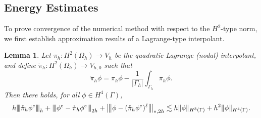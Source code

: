 \documentclass[10pt, a4paper]{amsart}
\newtheorem{lemma}[theorem]{Lemma}
\theoremstyle{definition}
\theoremstyle{remark}
\theoremstyle{example}
\numberwithin{equation}{section}
\newcommand{\tbar}[1]{{\left\vert\kern-0.25ex\left\vert\kern-0.25ex\left\vert #1 
    \right\vert\kern-0.25ex\right\vert\kern-0.25ex\right\vert}}
\begin{document}
\subsection{Energy Estimates}
To prove convergence of the numerical method
with respect to the $H^2$-type norm,
we first establish approximation results
of a Lagrange-type interpolant.
\begin{lemma} \label{lem:InterpFun}
Let $\pi_h:H^2(\Omega_h)\to V_{h}$ be the
quadratic Lagrange (nodal) interpolant, and define $\mathring{\pi}_h:H^2(\Omega_h)\to V_{h,0}$
such that
\[
\mathring{\pi}_h \phi = \pi_h \phi - \frac1{|\Gamma_h|} \int_{\Gamma_h} \pi_h \phi.
\]
Then there holds, for all $\phi\in H^4(\Gamma)$,
\begin{align} \label{4.8}
h \tbar{\mathring{\pi}_h \phi^e}_h+ \tbar{\phi^e - \mathring{\pi}_h \phi^e}_{2h}+ \tbar{\phi-(\mathring{\pi}_h \phi^e)^\ell}_{*,2h}\lesssim h \|\phi\|_{H^3(\Gamma)}+h^2 \|\phi\|_{H^4(\Gamma)}.
\end{align}
\end{lemma}
\end{document}
